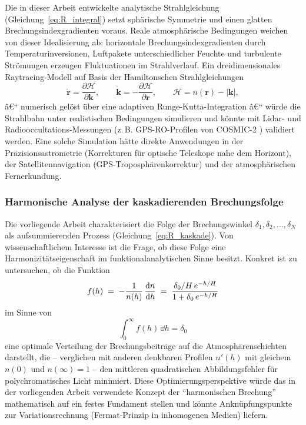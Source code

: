 ﻿\documentclass[12pt,a4paper]{article}
\begin{document}
Die in dieser Arbeit entwickelte analytische Strahlgleichung
(Gleichung~\ref{eq:R_integral}) setzt sphärische Symmetrie und
einen glatten Brechungsindexgradienten voraus.
Reale atmosphärische Bedingungen weichen von dieser Idealisierung ab:
horizontale Brechungsindexgradienten durch Temperaturinversionen,
Luftpakete unterschiedlicher Feuchte und turbulente Strömungen
erzeugen Fluktuationen im Strahlverlauf.
Ein dreidimensionales Raytracing-Modell auf Basis der Hamiltonschen
Strahlgleichungen
\begin{equation}
  \dot{\mathbf{r}} = \frac{\partial \mathcal{H}}{\partial \mathbf{k}}, \qquad
  \dot{\mathbf{k}} = -\frac{\partial \mathcal{H}}{\partial \mathbf{r}},
  \qquad \mathcal{H} = n(\mathbf{r}) - |\mathbf{k}|,
  \label{eq:hamilton_ray}
\end{equation}
â€“ numerisch gelöst über eine adaptiven Runge-Kutta-Integration â€“
würde die Strahlbahn unter realistischen Bedingungen simulieren
und könnte mit Lidar- und Radiooccultations-Messungen
(z.\,B. GPS-RO-Profilen von COSMIC-2 \citep{Anthes2008}) validiert werden.
Eine solche Simulation hätte direkte Anwendungen in der
Präzisionsastrometrie (Korrekturen für optische Teleskope nahe
dem Horizont), der Satellitennavigation (GPS-Troposphärenkorrektur)
und der atmosphärischen Fernerkundung.

\subsubsection{Harmonische Analyse der kaskadierenden Brechungsfolge}

Die vorliegende Arbeit charakterisiert die Folge der Brechungswinkel
$\delta_1, \delta_2, \ldots, \delta_N$ als aufsummierenden Prozess
(Gleichung~\ref{eq:R_kaskade}).
Von wissenschaftlichem Interesse ist die Frage, ob diese Folge
eine Harmonizitätseigenschaft im funktionalanalytischen Sinne besitzt.
Konkret ist zu untersuchen, ob die Funktion
\begin{equation}
  f(h) \;=\; -\frac{1}{n(h)}\,\dv{n}{h}
           \;=\; \frac{\delta_0/H\,e^{-h/H}}{1 + \delta_0\,e^{-h/H}}
  \label{eq:harmonik_f}
\end{equation}
im Sinne von
\begin{equation}
  \int_0^\infty f(h)\,\dd h = \delta_0
  \label{eq:harmonik_integral}
\end{equation}
eine optimale Verteilung der Brechungsbeiträge auf die Atmosphärenschichten
darstellt, die -- verglichen mit anderen denkbaren Profilen $n'(h)$ mit
gleichem $n(0)$ und $n(\infty)=1$ -- den mittleren quadratischen
Abbildungsfehler für polychromatisches Licht minimiert.
Diese Optimierungsperspektive würde das in der vorliegenden Arbeit
verwendete Konzept der ``harmonischen Brechung'' mathematisch auf ein
festes Fundament stellen und könnte Anknüpfungspunkte zur
Variationsrechnung (Fermat-Prinzip in inhomogenen Medien) liefern.
\end{document}
